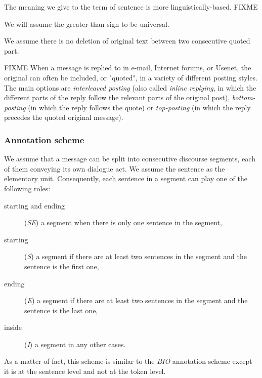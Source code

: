The meaning we give to the term of sentence is more linguistically-based. FIXME



We will assume the greater-than sign to be universal. 




We assume there is no deletion of original text between two consecutive quoted part.



FIXME When a message is replied to in e-mail, Internet forums, or Usenet, the original can often be included, or "quoted", in a variety of different posting styles.
%
The main options are {\em interleaved posting} (also called {\em inline replying}, in which the different parts of the reply follow the relevant parts of the original post), \textit{bottom-posting} (in which the reply follows the quote) or \textit{top-posting} (in which the reply precedes the quoted original message). 


\subsubsection{Annotation scheme}
\label{}


We assume that a message can be split into %
 consecutive discourse segments, each of them conveying its own dialogue act.
We assume the sentence as the elementary unit.
Consequently, each sentence in a segment can play one of the following roles: 
\begin{description}
\item [starting and ending] (\textit{SE}) a segment when there is only one sentence in the segment, 
\item [starting] (\textit{S}) a segment if there are at least two sentences in the segment and the sentence is the first one, 
\item [ending] (\textit{E}) a segment if there are at least two sentences in the segment and the sentence is the last one, 
\item [inside] (\textit{I}) a segment in any other cases.
\end{description}
%
As a matter of fact, this scheme is similar to the \textit{BIO} annotation scheme except it is at the sentence level and not at the token level.


